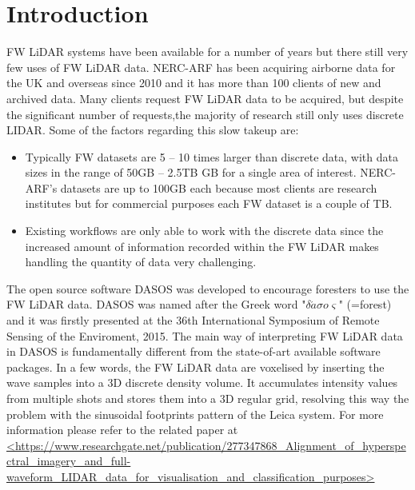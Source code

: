 \documentclass{article}
\begin{document}
\newpage
    \tableofcontents	 
    
\newpage  
	\setcounter{secnumdepth}{3}
	\section{Introduction} \label{Introduction}
	
	\par FW LiDAR systems have been available for a number of years but there still very few uses of FW LiDAR data. NERC-ARF has been acquiring airborne data for the UK and overseas since 2010 and it has more than 100 clients of new and archived data. Many clients request FW LiDAR data to be acquired, but despite the significant number of requests,the majority of research still only uses discrete LIDAR. Some of the factors regarding this slow takeup are:
	\begin{itemize}
		\item Typically FW datasets are 5 – 10 times larger than discrete data, with data sizes in the range of 50GB – 2.5TB GB for a single area of interest. NERC-ARF's datasets are up to 100GB each because most clients are research institutes but for commercial purposes each FW dataset is a couple of TB.
		\item Existing workflows are only able to work with the discrete data since the increased amount of information recorded within the FW LiDAR makes handling the quantity of data very challenging.
	\end{itemize}
	
	\par The open source software DASOS was developed to encourage foresters to use the FW LiDAR data. DASOS was named after the Greek word "$\delta\acute{a}\sigma o\varsigma$" (=forest) and it was firstly presented at the 36th International Symposium of Remote Sensing of the Enviroment, 2015. The main way of interpreting FW LiDAR data in DASOS is fundamentally different from the state-of-art available software packages. In a few words, the FW LiDAR data are voxelised by inserting the wave samples into a 3D discrete density volume. It accumulates intensity values from multiple shots and stores them into a 3D regular grid, resolving this way the problem with the sinusoidal footprints pattern of the Leica system. For more information please refer to the related paper at \url{<https://www.researchgate.net/publication/277347868_Alignment_of_hyperspectral_imagery_and_full-waveform_LIDAR_data_for_visualisation_and_classification_purposes>}
	
\end{document}
